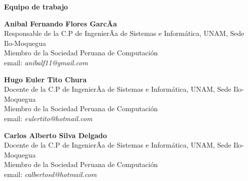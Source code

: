 \begin{center}
{\bf \Huge Equipo de trabajo}
\end{center}
\vspace{1cm}

\begin{center}
\textbf{Anibal Fernando Flores GarcÃ­a}\\
Responsable de la C.P de IngenierÃ­a de Sistemas e Informática, UNAM, Sede Ilo-Moquegua\\
Miembro de la Sociedad Peruana de Computación\\
email: \textit{anibalf11@gmail.com}\\
\end{center}

\begin{center}
\textbf{Hugo Euler Tito Chura}\\
Docente de la C.P de IngenierÃ­a de Sistemas e Informática, UNAM, Sede Ilo-Moquegua\\
Miembro de la Sociedad Peruana de Computación\\
email: \textit{eulertito@hotmail.com}\\
\end{center}

\begin{center}
\textbf{Carlos Alberto Silva Delgado}\\
Docente de la C.P de IngenierÃ­a de Sistemas e Informática, UNAM, Sede Ilo-Moquegua\\
Miembro de la Sociedad Peruana de Computación\\
email: \textit{calbertosd@hotmail.com}\\
\end{center}

